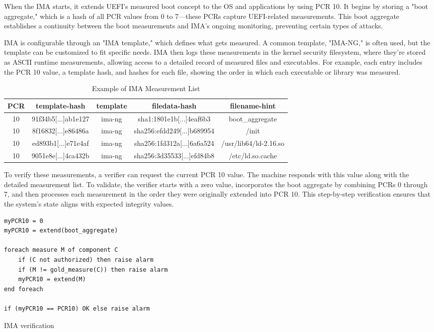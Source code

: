 When the IMA starts, it extends UEFI's measured boot concept to the OS
and applications by using PCR 10. It begins by storing a "boot
aggregate," which is a hash of all PCR values from 0 to 7—these PCRs
capture UEFI-related measurements. This boot aggregate establishes a
continuity between the boot measurements and IMA's ongoing monitoring,
preventing certain types of attacks.

IMA is configurable through an "IMA template," which defines what gets
measured. A common template, "IMA-NG," is often used, but the template
can be customized to fit specific needs. IMA then logs these
measurements in the kernel security filesystem, where they’re stored
as ASCII runtime measurements, allowing access to a detailed record of
measured files and executables. For example, each entry includes the
PCR 10 value, a template hash, and hashes for each file, showing the
order in which each executable or library was measured.

\begin{table}[h!]
  \centering
  \begin{tabular}{|c|c|c|c|c|}
    \hline
    \textbf{PCR} & \textbf{template-hash} & \textbf{template} & \textbf{filedata-hash} & \textbf{filename-hint} \\
    \hline
    10 & 91f34b5[...]ab1e127 & ima-ng & sha1:1801e1b[...]4eaf6b3 & boot\_aggregate \\
    10 & 8f16832[...]e86486a & ima-ng & sha256:efdd249[...]b689954 & /init \\
    10 & ed893b1[...]e71e4af & ima-ng & sha256:1fd312a[...]6a6a524 & /usr/lib64/ld-2.16.so \\
    10 & 9051e8e[...]4ca432b & ima-ng & sha256:3d35533[...]efd84b8 & /etc/ld.so.cache \\
    \hline
  \end{tabular}
  \caption{Example of IMA Measurement List}
\end{table}


To verify these measurements, a verifier can request the current PCR
10 value. The machine responds with this value along with the detailed
measurement list. To validate, the verifier starts with a zero value,
incorporates the boot aggregate by combining PCRs 0 through 7, and
then processes each measurement in the order they were originally
extended into PCR 10. This step-by-step verification ensures that the
system's state aligns with expected integrity values.

\begin{listing}
  \centering
  \begin{verbatim}
myPCR10 = 0
myPCR10 = extend(boot_aggregate)

foreach measure M of component C
    if (C not authorized) then raise alarm
    if (M != gold_measure(C)) then raise alarm
    myPCR10 = extend(M)
end foreach

if (myPCR10 == PCR10) OK else raise alarm
  \end{verbatim}
  \caption{IMA verification}
\end{listing}


